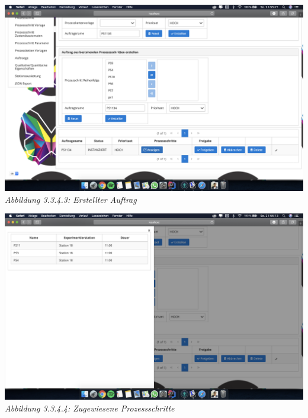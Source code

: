 \documentclass[enabledeprecatedfontcommands,fontsize=12pt,paper=a4,twoside]{scrartcl}
\begin{document}
\hypertarget{sc3.3.4.3}{
\includegraphics[width=1\textwidth]{Screenshots/3343.png}
\textit{Abbildung 3.3.4.3: Erstellter Auftrag}
} 

\hypertarget{sc3.3.4.4}{
\includegraphics[width=1\textwidth]{Screenshots/3344.png}
\textit{Abbildung 3.3.4.4: Zugewiesene Prozessschritte}
} 

\end{document}
